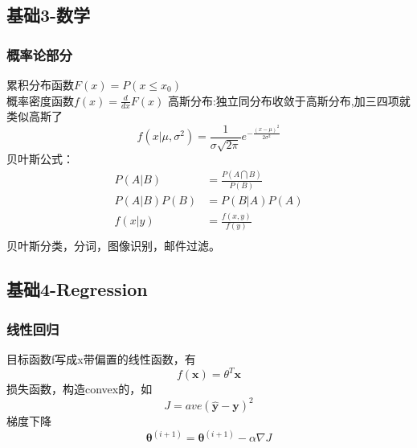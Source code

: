 \documentclass[UTF8]{../computerUniverse}
\begin{document}
\subsection{基础3-数学}



\subsubsection{概率论部分}
累积分布函数$F(x)=P(x \leqslant x_0)$\\
概率密度函数$f(x)=\frac{d}{dx}F(x)$
高斯分布:独立同分布收敛于高斯分布,加三四项就类似高斯了
\begin{equation}
f(x| \mu ,\sigma^2)= \frac{1}{\sigma \sqrt{2\pi}}e^{-\frac{(x-\mu)^2}{2\sigma^2}}
\end{equation}
贝叶斯公式：
\begin{equation}
\begin{split}
    P(A|B) &= \frac{P(A \bigcap B )}{P(B)}\\
    P(A|B) P(B)&= P(B|A) P(A)  \\
    f(x|y) &= \frac{f(x,y)}{f(y)}\\
\end{split}
\end{equation}
贝叶斯分类，分词，图像识别，邮件过滤。



\subsection{基础4-Regression}
\subsubsection{线性回归}
目标函数f写成x带偏置的线性函数，有
\begin{equation}
f(\mathbf x)=\theta ^T \mathbf x
\end{equation}
损失函数，构造convex的，如
\begin{equation}
J= ave (\hat {\mathbf y}-\mathbf y)^2
\end{equation}
梯度下降
\begin{equation}
\mathbf \theta ^{(i+1)}=\mathbf \theta ^{(i+1)}-\alpha \nabla J
\end{equation}
 
\end{document}
